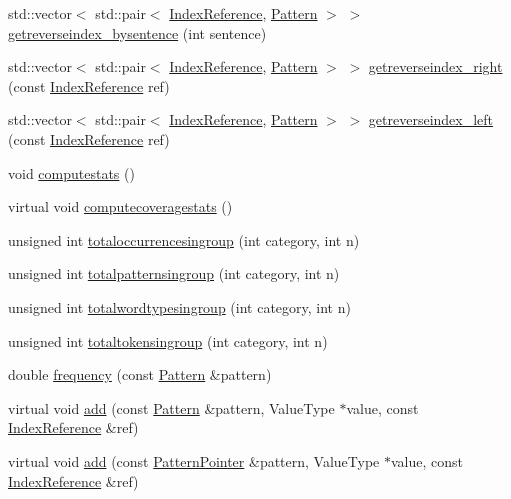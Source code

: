 \begin{DoxyCompactItemize}
\item 
std\+::vector$<$ std\+::pair$<$ \hyperlink{classIndexReference}{Index\+Reference}, \hyperlink{classPattern}{Pattern} $>$ $>$ \hyperlink{classPatternModel_abca7b37dfacef90de4e2139acb99cedb}{getreverseindex\+\_\+bysentence} (int sentence)
\item 
std\+::vector$<$ std\+::pair$<$ \hyperlink{classIndexReference}{Index\+Reference}, \hyperlink{classPattern}{Pattern} $>$ $>$ \hyperlink{classPatternModel_a0c49738d4296c9dde3ee2796d6b66814}{getreverseindex\+\_\+right} (const \hyperlink{classIndexReference}{Index\+Reference} ref)
\item 
std\+::vector$<$ std\+::pair$<$ \hyperlink{classIndexReference}{Index\+Reference}, \hyperlink{classPattern}{Pattern} $>$ $>$ \hyperlink{classPatternModel_aec29a383939fa71f61edfea80ea1b2d0}{getreverseindex\+\_\+left} (const \hyperlink{classIndexReference}{Index\+Reference} ref)
\item 
void \hyperlink{classPatternModel_a06b0d7452c19849930d6b3d19888130d}{computestats} ()
\item 
virtual void \hyperlink{classPatternModel_ae36bb1e641f954ee78a5fbab98ae069a}{computecoveragestats} ()
\item 
unsigned int \hyperlink{classPatternModel_a4ad5fd4ad8ed72160938ca9a30d26201}{totaloccurrencesingroup} (int category, int n)
\item 
unsigned int \hyperlink{classPatternModel_a38fd6f8f536a802d6653665aa4d48cbf}{totalpatternsingroup} (int category, int n)
\item 
unsigned int \hyperlink{classPatternModel_a23de99349652ec0774db5d09593bd255}{totalwordtypesingroup} (int category, int n)
\item 
unsigned int \hyperlink{classPatternModel_aaa5f43e06e2262fc4387729fc6265050}{totaltokensingroup} (int category, int n)
\item 
double \hyperlink{classPatternModel_a0927686caf05d2e1accff6e158a75188}{frequency} (const \hyperlink{classPattern}{Pattern} \&pattern)
\item 
virtual void \hyperlink{classPatternModel_a0cdb8badafbce0f56089f7c2b8f4716a}{add} (const \hyperlink{classPattern}{Pattern} \&pattern, Value\+Type $\ast$value, const \hyperlink{classIndexReference}{Index\+Reference} \&ref)
\item 
virtual void \hyperlink{classPatternModel_ad16097db7894d75815cd40ef5acc99a5}{add} (const \hyperlink{classPatternPointer}{Pattern\+Pointer} \&pattern, Value\+Type $\ast$value, const \hyperlink{classIndexReference}{Index\+Reference} \&ref)

\end{DoxyCompactItemize}
